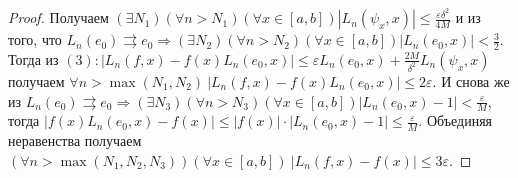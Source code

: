 \begin{proof}
Получаем $(\exists N_1)(\forall n > N_1)(\forall x\in [a,b]) |L_n(\psi_x,x)|\leqslant\frac{\varepsilon\delta^2}{4M}$ и из того, что $L_n(e_0)\rightrightarrows  e_0\Rightarrow (\exists N_2)(\forall n > N_2)(\forall x\in [a,b]) |L_n(e_0,x)|<\frac{3}{2}$. Тогда из $(3): |L_n(f,x)-f(x)L_n(e_0,x)|\leqslant\varepsilon L_n(e_0,x)+\frac{2M}{\delta^2}L_n(\psi_x,x)$ получаем $\forall n > \max(N_1, N_2)\  |L_n(f,x)-f(x)L_n(e_0, x)|\leqslant 2\varepsilon$. И снова же из $L_n(e_0)\rightrightarrows e_0\Rightarrow(\exists N_3)(\forall n>N_3)(\forall x\in [a,b]) |L_n(e_0, x)-1|<\frac{\varepsilon}{M}$, тогда $|f(x)L_n(e_0, x)-f(x)|\leqslant
|f(x)|\cdot|L_n(e_0,x)-1|\leqslant\frac{\varepsilon}{M}$. Объединяя неравенства получаем $(\forall n > \max(N_1, N_2, N_3))(\forall x\in [a,b])\ |L_n(f,x)-f(x)|\leqslant 3\varepsilon$.
\end{proof}

